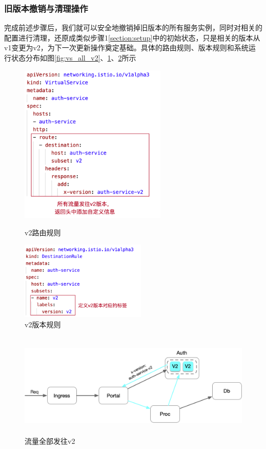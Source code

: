 \documentclass[12pt,a4paper]{article}
\theoremstyle{definition}
\begin{document}
\subsubsection{旧版本撤销与清理操作}
完成前述步骤后，我们就可以安全地撤销掉旧版本的所有服务实例，同时对相关的配置进行清理，还原成类似步骤1\ref{section:setup}中的初始状态，只是相关的版本从v1变更为v2，为下一次更新操作奠定基础。具体的路由规则、版本规则和系统运行状态分布如图\ref{fig:vs_all_v2}、\ref{fig:dr_v2}、\ref{fig:traffic_all_v2}所示
\begin{figure}[htbp]
\centering
\begin{minipage}[t]{0.48\textwidth}
\centering
\centerline{\includegraphics[width=7cm]{vs_all_v2.png}}
\caption{v2路由规则}
\label{fig:vs_all_v2}
\end{minipage}
\begin{minipage}[t]{0.48\textwidth}
\centering
\centerline{\includegraphics[width=6cm]{dr_v2.png}}
\caption{v2版本规则}
\label{fig:dr_v2}
\end{minipage}
\end{figure}
\begin{figure}[ht]
 \centering
 \includegraphics[height=5cm]{images/traffic_all_v2.png}
 \caption{流量全部发往v2}
 \label{fig:traffic_all_v2}
\end{figure}
\end{document}
